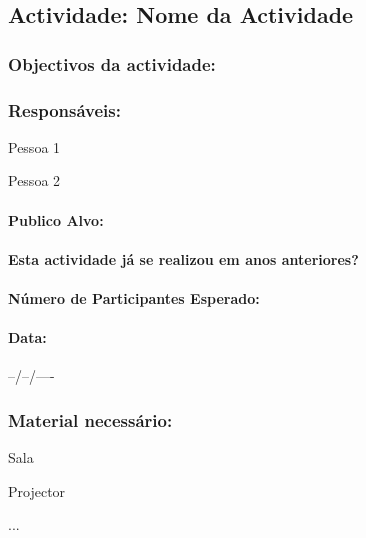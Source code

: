 \subsection{Actividade: Nome da Actividade} %

\subsubsection*{Objectivos da actividade:}

\subsubsection*{Responsáveis:}
\begin{itemizedash}
	\item{Pessoa 1}
	\item{Pessoa 2}
\end{itemizedash}

\paragraph{Publico Alvo: }

\paragraph{Esta actividade já se realizou em anos anteriores?}

\paragraph{Número de Participantes Esperado:}

\paragraph{Data:} --/--/----

\subsubsection*{Material necessário:}
\begin{itemizedash}
	\item{Sala}
	\item{Projector}
	\item{...}
\end{itemizedash}

\vspace{20pt}
